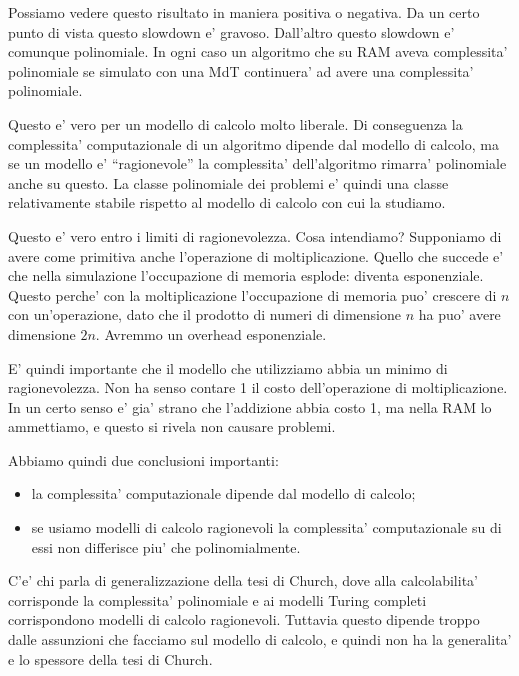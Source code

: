 Possiamo vedere questo risultato in maniera positiva o negativa. Da un certo punto di vista questo
slowdown e' gravoso. Dall'altro questo slowdown e' comunque polinomiale. In ogni caso un algoritmo
che su RAM aveva complessita' polinomiale se simulato con una MdT continuera' ad avere una
complessita' polinomiale.

Questo e' vero per un modello di calcolo molto liberale. Di conseguenza la complessita'
computazionale di un algoritmo dipende dal modello di calcolo, ma se un modello e' ``ragionevole''
la complessita' dell'algoritmo rimarra' polinomiale anche su questo. La classe polinomiale dei
problemi e' quindi una classe relativamente stabile rispetto al modello di calcolo con cui la
studiamo.

Questo e' vero entro i limiti di ragionevolezza. Cosa intendiamo? Supponiamo di avere come primitiva
anche l'operazione di moltiplicazione. Quello che succede e' che nella simulazione l'occupazione di
memoria esplode: diventa esponenziale. Questo perche' con la moltiplicazione l'occupazione di
memoria puo' crescere di $n$ con un'operazione, dato che il prodotto di numeri di dimensione $n$ ha
puo' avere dimensione $2n$. Avremmo un overhead esponenziale.

E' quindi importante che il modello che utilizziamo abbia un minimo di ragionevolezza. Non ha senso
contare 1 il costo dell'operazione di moltiplicazione. In un certo senso e' gia' strano che
l'addizione abbia costo 1, ma nella RAM lo ammettiamo, e questo si rivela non causare problemi.

Abbiamo quindi due conclusioni importanti:
\begin{itemize}
    \item la complessita' computazionale dipende dal modello di calcolo;
    \item se usiamo modelli di calcolo ragionevoli la complessita' computazionale su di essi non
    differisce piu' che polinomialmente.
\end{itemize}

C'e' chi parla di generalizzazione della tesi di Church, dove alla calcolabilita' corrisponde la
complessita' polinomiale e ai modelli Turing completi corrispondono modelli di calcolo ragionevoli.
Tuttavia questo dipende troppo dalle assunzioni che facciamo sul modello di calcolo, e quindi non ha
la generalita' e lo spessore della tesi di Church.
